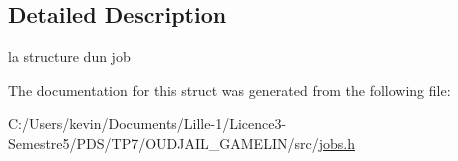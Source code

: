 \subsection{Detailed Description}
la structure d\textquotesingle{}un job 

The documentation for this struct was generated from the following file\+:\begin{DoxyCompactItemize}
\item 
C\+:/\+Users/kevin/\+Documents/\+Lille-\/1/\+Licence3-\/\+Semestre5/\+P\+D\+S/\+T\+P7/\+O\+U\+D\+J\+A\+I\+L\+\_\+\+G\+A\+M\+E\+L\+I\+N/src/\hyperlink{jobs_8h}{jobs.\+h}\end{DoxyCompactItemize}
